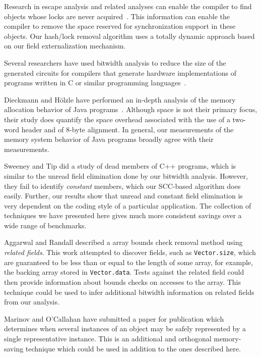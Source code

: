 \documentclass{acmconf}
\begin{document}
Research in escape analysis and related analyses can enable the
compiler to find objects whose locks are never 
acquired~\cite{ACSE99,BH99,whaley99,CGSSM99,Ruf00:PLDI00,salcianu01}.
This information can enable the compiler to remove the space
reserved for synchronization support in these objects. 
Our hash/lock removal algorithm uses a totally dynamic approach
based on our field externalization mechanism. 

Several researchers have used bitwidth analysis to reduce the size
of the generated circuits for compilers that generate hardware
implementations of programs written in C or similar programming 
languages~\cite{ananian:siliconc,ananian99:tech,RR00:PLDI00,stephenson00,BGSW00}.

Dieckmann and H\"olzle have performed an in-depth analysis of the
memory allocation behavior of Java programs~\cite{DH99}. Although 
space is not their primary focus, their study does quantify 
the space overhead associated with the use of a two-word header
and of 8-byte alignment. In general, our measurements of the 
memory system behavior of Java programs broadly agree with their
measurements. 

Sweeney and Tip \cite{SweeneyTip98DeadDataMembers} did a study of dead
members of C++ programs, which is similar to the unread field
elimination done by our bitwidth analysis.  However, they
fail to identify {\it constant} members, which our SCC-based algorithm
does easily.  Further, our results show that unread and constant field
elimination is very dependent on the coding style of a particular
application.  The collection of techniques we have presented here
gives much more consistent savings over a wide range of benchmarks.

Aggarwal and Randall \cite{aggarwal01} described a array bounds check
removal method using {\it related fields}.  This work attempted to
discover fields, such as {\tt Vector.size}, which are guaranteed to be
less than or equal to the length of some array, for example, the
backing array stored in {\tt Vector.data}.  Tests against the related
field could then provide information about bounds checks on accesses
to the array.  This technique could be used to infer additional
bitwidth information on related fields from our analysis.

Marinov and O'Callahan have submitted a paper for publication
\cite{marinov03} which determines when several instances of an
object may be safely represented by a single representative instance.
This is an additional and orthogonal memory-saving technique which
could be used in addition to the ones described here.
\end{document}
